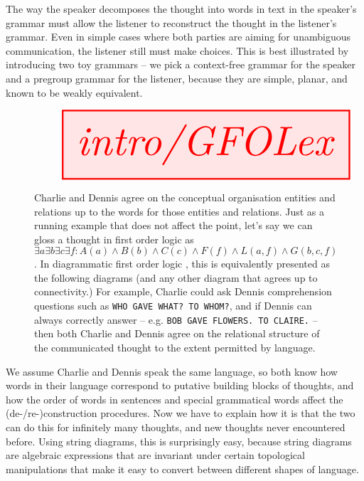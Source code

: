  The way the speaker decomposes the thought into words in text in the speaker's grammar must allow the listener to reconstruct the thought in the listener's grammar. Even in simple cases where both parties are aiming for unambiguous communication, the listener still must make choices. This is best illustrated by introducing two toy grammars -- we pick a context-free grammar for the speaker and a pregroup grammar for the listener, because they are simple, planar, and known to be weakly equivalent.

\begin{figure}[h!]\label{fig:GFOLex}
\centering
\[\resizebox{\textwidth}{!}{\tikzfig{intro/GFOLex}}\]
\caption{Charlie and Dennis agree on the conceptual organisation entities and relations up to the words for those entities and relations. Just as a running example that does not affect the point, let's say we can gloss a thought in first order logic as $\exists a \exists b \exists c \exists f : A(a) \wedge B(b) \wedge C(c) \wedge F(f) \wedge L(a,f) \wedge G(b,c,f)$. In diagrammatic first order logic \citep{haydonCompositionalDiagrammaticFirstOrder2020d}, this is equivalently presented as the following diagrams (and any other diagram that agrees up to connectivity.) For example, Charlie could ask Dennis comprehension questions such as \texttt{WHO GAVE WHAT? TO WHOM?}, and if Dennis can always correctly answer -- e.g. \texttt{BOB GAVE FLOWERS. TO CLAIRE.} -- then both Charlie and Dennis agree on the relational structure of the communicated thought to the extent permitted by language.}
\end{figure}

We assume Charlie and Dennis speak the same language, so both know how words in their language correspond to putative building blocks of thoughts, and how the order of words in sentences and special grammatical words affect the (de-/re-)construction procedures. Now we have to explain how it is that the two can do this for infinitely many thoughts, and new thoughts never encountered before. Using string diagrams, this is surprisingly easy, because string diagrams are algebraic expressions that are invariant under certain topological manipulations that make it easy to convert between different shapes of language.

